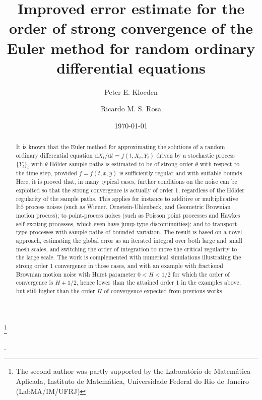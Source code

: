 \documentclass[reqno,12pt]{amsart}
\theoremstyle{plain} %
\theoremstyle{definition} %
\begin{document}


\title[Strong convergence of the Euler method for Random ODEs]{Improved error estimate for the order of strong convergence of the Euler method for random ordinary differential equations}

\author[P. E. Kloeden]{Peter E. Kloeden}
\author[R. M. S. Rosa]{Ricardo M. S. Rosa}

\address[Peter E. Kloeden]{Mathematics Department, University of Tubingen, Germany}
\address[Ricardo M. S. Rosa]{Instituto de Matem\'atica, Universidade Federal do Rio de Janeiro, Brazil}


\date{\today}

\thanks{The second author was partly supported by the Laborat\'orio de Matem\'atica Aplicada, Instituto de Matem\'atica, Universidade Federal do Rio de Janeiro (LabMA/IM/UFRJ)}

.

\begin{abstract}
It is known that the Euler method for approximating the solutions of a random ordinary differential equation $\mathrm{d}X_t/\mathrm{d}t = f(t, X_t, Y_t)$ driven by a stochastic process $\{Y_t\}_t$ with $\theta$-H\"older sample paths is estimated to be of strong order $\theta$ with respect to the time step, provided $f=f(t, x, y)$ is sufficiently regular and with suitable bounds. Here, it is proved that, in many typical cases, further conditions on the noise can be exploited so that the strong convergence is actually of order 1, regardless of the H\"older regularity of the sample paths. This applies for instance to additive or multiplicative It\^o  process noises (such as Wiener, Ornstein-Uhlenbeck, and Geometric Brownian motion process); to point-process noises (such as Poisson point processes and Hawkes self-exciting processes, which even have jump-type discontinuities); and to transport-type processes with sample paths of bounded variation. The result is based on a novel approach, estimating the global error as an iterated integral over both large and small mesh scales, and switching the order of integration to move the critical regularity to the large scale. The work is complemented with numerical simulations illustrating the strong order 1 convergence in those cases, and with an example with fractional Brownian motion noise with Hurst parameter $0 < H < 1/2$ for which the order of convergence is $H + 1/2$, hence lower than the attained order 1 in the examples above, but still higher than the order $H$ of convergence expected from previous works.
\end{abstract}
\end{document}
